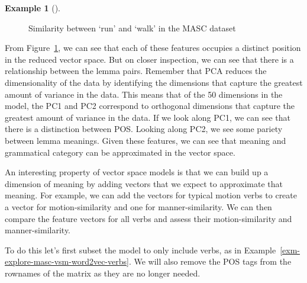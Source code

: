 \documentclass[
  letterpaper,
]{book}
\theoremstyle{definition}
\newtheorem{example}{Example}[chapter]
\theoremstyle{remark}
\begin{document}
\begin{example}[]
\begin{figure}[!htb]
{}

\caption{\label{fig-explore-masc-vsm-word2vec-similarity}Similarity
between `run' and `walk' in the MASC dataset}

\end{figure}%

\end{example}

From Figure~\ref{fig-explore-masc-vsm-word2vec-similarity}, we can see
that each of these features occupies a distinct position in the reduced
vector space. But on closer inspection, we can see that there is a
relationship between the lemma pairs. Remember that PCA reduces the
dimensionality of the data by identifying the dimensions that capture
the greatest amount of variance in the data. This means that of the 50
dimensions in the model, the PC1 and PC2 correspond to orthogonal
dimensions that capture the greatest amount of variance in the data. If
we look along PC1, we can see that there is a distinction between POS.
Looking along PC2, we see some pariety between lemma meanings. Given
these features, we can see that meaning and grammatical category can be
approximated in the vector space.

An interesting property of vector space models is that we can build up a
dimension of meaning by adding vectors that we expect to approximate
that meaning. For example, we can add the vectors for typical motion
verbs to create a vector for motion-similarity and one for
manner-similarity. We can then compare the feature vectors for all verbs
and assess their motion-similarity and manner-similarity.

To do this let's first subset the model to only include verbs, as in
Example~\ref{exm-explore-masc-vsm-word2vec-verbs}. We will also remove
the POS tags from the rownames of the matrix as they are no longer
needed.
\end{document}
